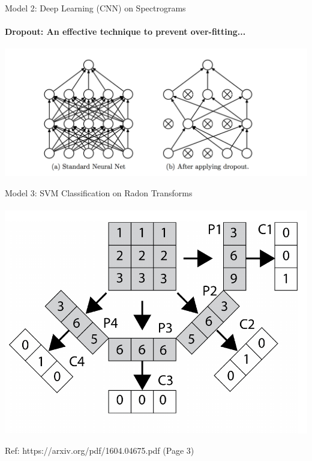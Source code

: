 \documentclass{beamer}
\begin{document}
\begin{frame}{Model 2: Deep Learning (CNN) on Spectrograms}
  \framesubtitle{Dropout: An effective technique to prevent over-fitting...}

  \begin{center}
  \includegraphics[scale=0.42]{img/dropout.png}
  \end{center}

\end{frame}



\begin{frame}{Model 3: SVM Classification on Radon Transforms}
  \framesubtitle{}

  \begin{center}
  \includegraphics[scale=0.38]{img/radon.png}

  Ref: https://arxiv.org/pdf/1604.04675.pdf (Page 3)
  \end{center}

\end{frame}
\end{document}

